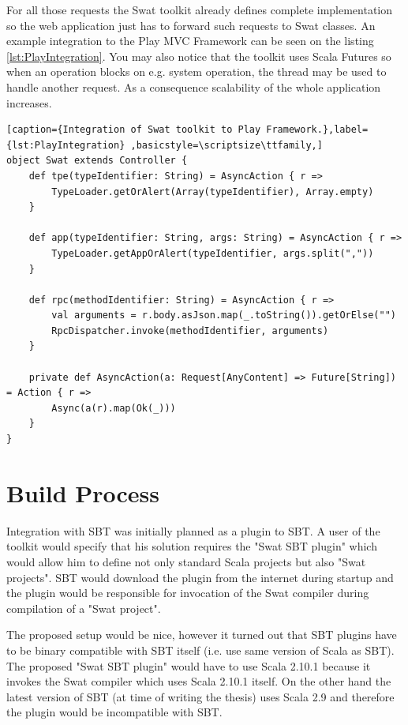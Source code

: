\documentclass[12pt,a4paper]{report}
\begin{document}
For all those requests the Swat toolkit already defines complete implementation so the web application just has to forward such requests to Swat classes. An example integration to the Play MVC Framework \cite{Play} can be seen on the listing \ref{lst:PlayIntegration}. You may also notice that the toolkit uses Scala Futures \cite{ScalaFutures} so when an operation blocks on e.g. system operation, the thread may be used to handle another request. As a consequence scalability of the whole application increases.

\begin{lstlisting}[caption={Integration of Swat toolkit to Play Framework.},label={lst:PlayIntegration}	,basicstyle=\scriptsize\ttfamily,]
object Swat extends Controller {
    def tpe(typeIdentifier: String) = AsyncAction { r =>
        TypeLoader.getOrAlert(Array(typeIdentifier), Array.empty)
    }

    def app(typeIdentifier: String, args: String) = AsyncAction { r =>
        TypeLoader.getAppOrAlert(typeIdentifier, args.split(","))
    }

    def rpc(methodIdentifier: String) = AsyncAction { r =>
        val arguments = r.body.asJson.map(_.toString()).getOrElse("")
        RpcDispatcher.invoke(methodIdentifier, arguments)
    }

    private def AsyncAction(a: Request[AnyContent] => Future[String]) = Action { r =>
        Async(a(r).map(Ok(_)))
    }
}
\end{lstlisting}

\section{Build Process}

Integration with SBT was initially planned as a plugin to SBT. A user of the toolkit would specify that his solution requires the "Swat SBT plugin" which would allow him to define not only standard Scala projects but also "Swat projects". SBT would download the plugin from the internet during startup and the plugin would be responsible for invocation of the Swat compiler during compilation of a "Swat project". 

The proposed setup would be nice, however it turned out that SBT plugins have to be binary compatible with SBT itself (i.e. use same version of Scala as SBT). The proposed "Swat SBT plugin" would have to use Scala 2.10.1 because it invokes the Swat compiler which uses Scala 2.10.1 itself. On the other hand the latest version of SBT (at time of writing the thesis) uses Scala 2.9 and therefore the plugin would be incompatible with SBT.
\end{document}
